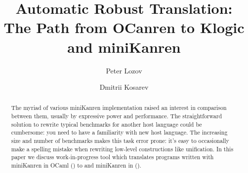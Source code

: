\documentclass[acmsmall,screen,review,anonymous]{acmart}
\begin{document}
\title[From OCanren to Klogic and miniKanren]{Automatic Robust Translation: The Path from OCanren to Klogic and miniKanren}


\author{Peter Lozov}
\author{Dmitrii Kosarev}


\renewcommand{\shortauthors}{Kosarev and Lozov}

\begin{abstract}
The myriad of various miniKanren implementation raised an interest in comparison between them, usually by expressive power and performance.
The straightforward solution to rewrite typical benchmarks for another host language
could be cumbersome: you need to have a familiarity with new host language.
The increasing size and number of benchmarks makes this task error prone: it's easy to occasionally make a spelling mistake when rewriting low-level constructions like unification. In this paper we discuss work-in-progress tool which translates programs written with miniKanren in OCaml (\OCanren{}) to \Scheme{} and miniKanren in \Kotlin{} (\Klogic{}).

\end{abstract}
\end{document}
